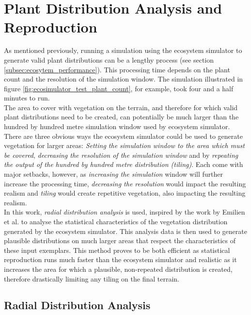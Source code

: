 \section{Plant Distribution Analysis and Reproduction} \label{sec:dist_analysis_and_rep}

As mentioned previously, running a simulation using the ecosystem simulator to generate valid plant distributions can be a lengthy process (see section \ref{subsec:ecosytem_performance}). This processing time depends on the plant count and the resolution of the simulation window. The simulation illustrated in figure \ref{fig:ecosimulator_test_plant_count}, for example, took four and a half minutes to run.\\

The area to cover with vegetation on the terrain, and therefore for which valid plant distributions need to be created, can potentially be much larger than the hundred by hundred metre simulation window used by ecosystem simulator. There are three obvious ways the ecosystem simulator could be used to generate vegetation for larger areas: \textit{Setting the simulation window to the area which must be covered}, \textit{decreasing the resolution of the simulation window} and by \textit{repeating the output of the hundred by hundred metre distribution (tiling)}. Each come with major setbacks, however, as \textit{increasing the simulation} window will further increase the processing time, \textit{decreasing the resolution} would impact the resulting realism and \textit{tiling} would create repetitive vegetation, also impacting the resulting realism.\\

In this work, \textit{radial distribution analysis} is used, inspired by the work by Emilien et al. \cite{Emilien} to analyse the statistical characteristics of the vegetation distribution generated by the ecosystem simulator. This analysis data is then used to generate plausible distributions on much larger areas that respect the characteristics of these input exemplars. This method proves to be both efficient as statistical reproduction runs much faster than the ecosystem simulator and realistic as it increases the area for which a plausible, non-repeated distribution is created, therefore drastically limiting any tiling on the final terrain.\\

\subsection{Radial Distribution Analysis} \label{subsec:radial_dist_analysis}

